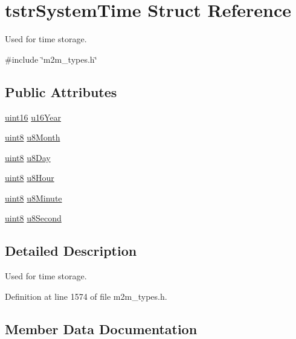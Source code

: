 \hypertarget{structtstrSystemTime}{}\section{tstr\+System\+Time Struct Reference}
\label{structtstrSystemTime}


Used for time storage.  




{\ttfamily \#include \char`\"{}m2m\+\_\+types.\+h\char`\"{}}

\subsection*{Public Attributes}
\begin{DoxyCompactItemize}
\item 
\hyperlink{group__DataT_ga1daa745171fc6e31d942c161422a76f9}{uint16} \hyperlink{structtstrSystemTime_ab5a0d75b4f24be7a741726aaf67f88ba}{u16\+Year}
\item 
\hyperlink{group__DataT_ga4df709a77647e870bbf1d955b8edc9a6}{uint8} \hyperlink{structtstrSystemTime_a4f0893418dc36ad7622444c42e8c9568}{u8\+Month}
\item 
\hyperlink{group__DataT_ga4df709a77647e870bbf1d955b8edc9a6}{uint8} \hyperlink{structtstrSystemTime_ab5cb1c79c5ef97eb8fe72c7a2a755328}{u8\+Day}
\item 
\hyperlink{group__DataT_ga4df709a77647e870bbf1d955b8edc9a6}{uint8} \hyperlink{structtstrSystemTime_ac8fe2421d9314b1f709c3d3ca9449058}{u8\+Hour}
\item 
\hyperlink{group__DataT_ga4df709a77647e870bbf1d955b8edc9a6}{uint8} \hyperlink{structtstrSystemTime_a9e24f7615a4930ddc0c0c0c11f6e4897}{u8\+Minute}
\item 
\hyperlink{group__DataT_ga4df709a77647e870bbf1d955b8edc9a6}{uint8} \hyperlink{structtstrSystemTime_a612436cd80c73e608cbc32edc5f74f90}{u8\+Second}
\end{DoxyCompactItemize}


\subsection{Detailed Description}
Used for time storage. 

Definition at line 1574 of file m2m\+\_\+types.\+h.



\subsection{Member Data Documentation}
\mbox{\label{structtstrSystemTime_ab5a0d75b4f24be7a741726aaf67f88ba}} 
